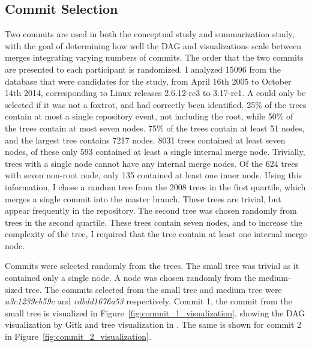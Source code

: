 \subsection{Commit Selection}\label{sub:commit_selection}

Two commits are used in both the conceptual study and summarization
study, with the goal of determining how well the DAG and \mt{}
visualizations scale between merges integrating varying numbers of
commits. The order that the two commits are presented to each
participant is randomized. I analyzed 15096  from the
database that were candidates for the study, from April 16th 2005 to
October 14th 2014, corresponding to Linux releases 2.6.12-rc3 to
3.17-rc1. A \mt{} could only be selected if it was not a foxtrot,
and had correctly been identified. 25\% of the trees contain at most a
single repository event, not including the root, while 50\% of the trees
contain at most seven nodes. 75\% of the trees contain at least 51
nodes, and the largest tree contains 7217 nodes. 8031 trees contained at
least seven nodes, of these only 593 contained at least a single
internal merge node. Trivially, trees with a single node cannot have any
internal merge nodes. Of the 624 trees with seven non-root node, only
135 contained at least one inner node. Using this information, I chose a
random tree from the 2008 trees in the first quartile, which merges a
single commit into the master branch. These trees are trivial, but
appear frequently in the repository. The second tree was chosen randomly
from trees in the second quartile. These trees contain seven nodes, and
to increase the complexity of the tree, I required that the tree contain
at least one internal merge node.

Commits were selected randomly from the trees.
The small tree was trivial as it contained only a single node.
A node was chosen randomly from the medium-sized tree.
The commits selected from the small tree and medium tree were
\emph{a3c1239eb59c} and \emph{cdbdd1676a53} respectively.
Commit 1, the commit from the small tree is visualized in
Figure~\ref{fig:commit_1_visualization}, showing the DAG visualization
by Gitk and \rt{} tree visualization in \tool{}.
The same is shown for commit 2 in
Figure~\ref{fig:commit_2_visualization}.

